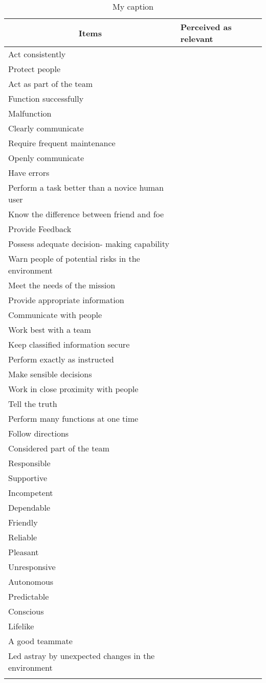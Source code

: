 \begin{longtable}{l|l}
	\multicolumn{1}{c|}{\textbf{Items}} & \textbf{Perceived as relevant} \\ \hline
	\endhead
	Act consistently & \\ \hline
	Protect people & \\ \hline
	Act as part of the team & \\ \hline
	Function successfully & \\ \hline
	Malfunction & \\ \hline
	Clearly communicate & \\ \hline
	Require frequent maintenance & \\ \hline
	Openly communicate & \\ \hline
	Have errors & \\ \hline
	Perform a task better than a novice human user & \\ \hline
	Know the difference between friend and foe & \\ \hline
	Provide Feedback & \\ \hline
	Possess adequate decision- making capability & \\ \hline
	Warn people of potential risks in the environment & \\ \hline
	Meet the needs of the mission & \\ \hline
	Provide appropriate information & \\ \hline
	Communicate with people & \\ \hline
	Work best with a team & \\ \hline
	Keep classified information secure & \\ \hline
	Perform exactly as instructed & \\ \hline
	Make sensible decisions & \\ \hline
	Work in close proximity with people & \\ \hline
	Tell the truth & \\ \hline
	Perform many functions at one time & \\ \hline
	Follow directions & \\ \hline
	Considered part of the team & \\ \hline
	Responsible & \\ \hline
	Supportive & \\ \hline
	Incompetent & \\ \hline
	Dependable & \\ \hline
	Friendly & \\ \hline
	Reliable & \\ \hline
	Pleasant & \\ \hline
	Unresponsive & \\ \hline
	Autonomous & \\ \hline
	Predictable & \\ \hline
	Conscious & \\ \hline
	Lifelike & \\ \hline
	A good teammate & \\ \hline
	Led astray by unexpected changes in the environment & \\
	\caption{My caption}
	\label{my-label}	
\end{longtable}